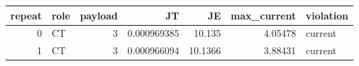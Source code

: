 \begin{tabular}{rlrrrrl}
\toprule
repeat & role & payload & JT & JE & max\_current & violation \\
\midrule
0 & CT & 3 & 0.000969385 & 10.135 & 4.05478 & current \\
1 & CT & 3 & 0.000966094 & 10.1366 & 3.88431 & current \\
\bottomrule
\end{tabular}
